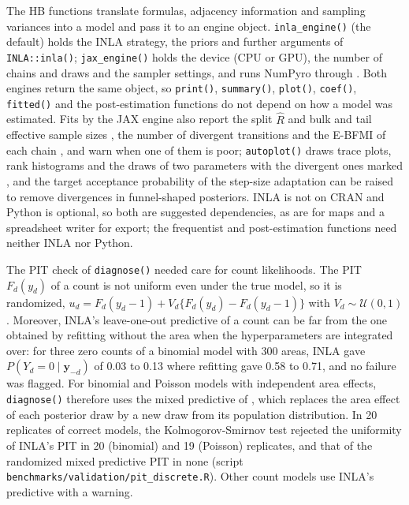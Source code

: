 The HB functions translate formulas, adjacency information and sampling variances into a model and pass it to an engine object. \texttt{inla\_engine()} (the default) holds the INLA strategy, the priors and further arguments of \texttt{INLA::inla()}; \texttt{jax\_engine()} holds the device (CPU or GPU), the number of chains and draws and the sampler settings, and runs NumPyro through . Both engines return the same object, so \texttt{print()}, \texttt{summary()}, \texttt{plot()}, \texttt{coef()}, \texttt{fitted()} and the post-estimation functions do not depend on how a model was estimated. Fits by the JAX engine also report the split \(\hat{R}\) and bulk and tail effective sample sizes \citep{vehtari2021rank}, the number of divergent transitions and the E-BFMI of each chain \citep{betancourt2016diagnosing}, and warn when one of them is poor; \texttt{autoplot()} draws trace plots, rank histograms and the draws of two parameters with the divergent ones marked \citep{gabry2019visualization}, and the target acceptance probability of the step-size adaptation can be raised to remove divergences in funnel-shaped posteriors. INLA is not on CRAN and Python is optional, so both are suggested dependencies, as are  for maps and a spreadsheet writer for export; the frequentist and post-estimation functions need neither INLA nor Python.

The PIT check of \texttt{diagnose()} needed care for count likelihoods. The PIT \(F_d(y_d)\) of a count is not uniform even under the true model, so it is randomized, \(u_d = F_d(y_d - 1) + V_d\{F_d(y_d) - F_d(y_d - 1)\}\) with \(V_d \sim \mathcal{U}(0, 1)\) \citep{czado2009predictive}. Moreover, INLA's leave-one-out predictive of a count can be far from the one obtained by refitting without the area when the hyperparameters are integrated over: for three zero counts of a binomial model with 300 areas, INLA gave \(P(Y_d = 0 \mid \boldsymbol{y}_{-d})\) of 0.03 to 0.13 where refitting gave 0.58 to 0.71, and no failure was flagged. For binomial and Poisson models with independent area effects, \texttt{diagnose()} therefore uses the mixed predictive of \citet{marshall2003approximate}, which replaces the area effect of each posterior draw by a new draw from its population distribution. In 20 replicates of correct models, the Kolmogorov-Smirnov test rejected the uniformity of INLA's PIT in 20 (binomial) and 19 (Poisson) replicates, and that of the randomized mixed predictive PIT in none (script \texttt{benchmarks/validation/pit\_discrete.R}). Other count models use INLA's predictive with a warning.

